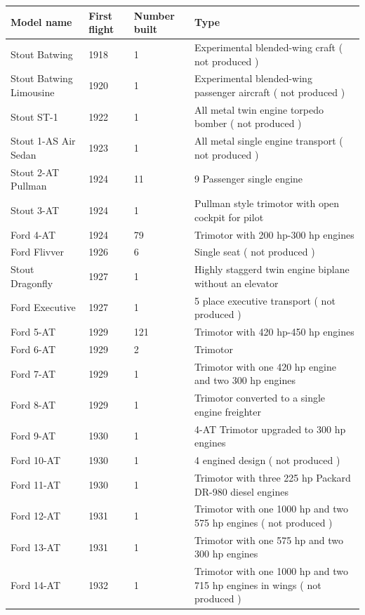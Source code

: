 \documentclass{article}
\begin{document}
\begin{tabular}{llll}
\toprule
Model name & First flight & Number built & Type \\
\midrule
Stout Batwing & 1918 & 1 & Experimental blended-wing craft ( not produced ) \\
Stout Batwing Limousine & 1920 & 1 & Experimental blended-wing passenger aircraft ( not produced ) \\
Stout ST-1 & 1922 & 1 & All metal twin engine torpedo bomber ( not produced ) \\
Stout 1-AS Air Sedan & 1923 & 1 & All metal single engine transport ( not produced ) \\
Stout 2-AT Pullman & 1924 & 11 & 9 Passenger single engine \\
Stout 3-AT & 1924 & 1 & Pullman style trimotor with open cockpit for pilot \\
Ford 4-AT & 1924 & 79 & Trimotor with 200 hp-300 hp engines \\
Ford Flivver & 1926 & 6 & Single seat ( not produced ) \\
Stout Dragonfly & 1927 & 1 & Highly staggerd twin engine biplane without an elevator \\
Ford Executive & 1927 & 1 & 5 place executive transport ( not produced ) \\
Ford 5-AT & 1929 & 121 & Trimotor with 420 hp-450 hp engines \\
Ford 6-AT & 1929 & 2 & Trimotor \\
Ford 7-AT & 1929 & 1 & Trimotor with one 420 hp engine and two 300 hp engines \\
Ford 8-AT & 1929 & 1 & Trimotor converted to a single engine freighter \\
Ford 9-AT & 1930 & 1 & 4-AT Trimotor upgraded to 300 hp engines \\
Ford 10-AT & 1930 & 1 & 4 engined design ( not produced ) \\
Ford 11-AT & 1930 & 1 & Trimotor with three 225 hp Packard DR-980 diesel engines \\
Ford 12-AT & 1931 & 1 & Trimotor with one 1000 hp and two 575 hp engines ( not produced ) \\
Ford 13-AT & 1931 & 1 & Trimotor with one 575 hp and two 300 hp engines \\
Ford 14-AT & 1932 & 1 & Trimotor with one 1000 hp and two 715 hp engines in wings ( not produced ) \\
\bottomrule
\end{tabular}
\end{document}
